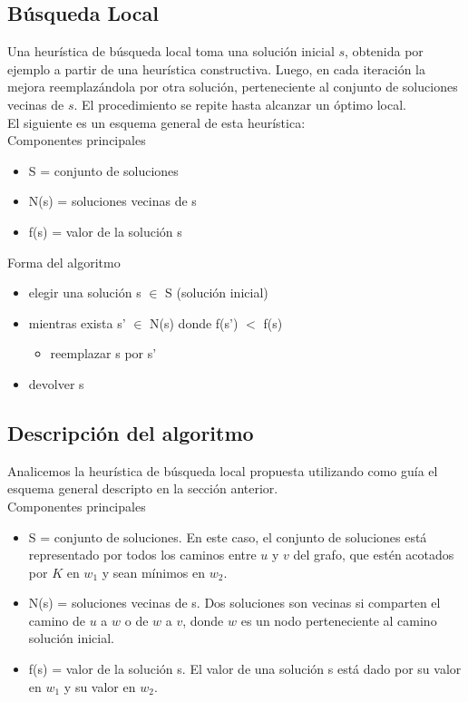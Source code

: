 \subsection{B\'usqueda Local}

Una heur\'istica de b\'usqueda local toma una soluci\'on inicial $s$, obtenida por ejemplo a partir de una heur\'istica constructiva. Luego, en cada iteraci\'on la mejora reemplaz\'andola por otra soluci\'on, perteneciente al conjunto de soluciones vecinas de $s$. El procedimiento se repite hasta alcanzar un \'optimo local.\\
El siguiente es un esquema general de esta heur\'istica:\\
Componentes principales

\begin{itemize}
\item S = conjunto de soluciones
\item N(s) = soluciones vecinas de s
\item f(s) = valor de la soluci\'on s
\end{itemize}

Forma del algoritmo
\begin{itemize}
\item elegir una soluci\'on s $\in$ S (soluci\'on inicial)
\item mientras exista s' $\in$ N(s) donde f(s') $<$ f(s)
\begin{itemize}
	\item reemplazar s por s'
\end{itemize}
\item devolver s
\end{itemize}

\subsection{Descripci\'on del algoritmo}

Analicemos la heur\'istica de b\'usqueda local propuesta utilizando como gu\'ia el esquema general descripto en la secci\'on anterior.\\

Componentes principales
\begin{itemize}
\item S = conjunto de soluciones. En este caso, el conjunto de soluciones est\'a representado por todos los caminos entre $u$ y $v$ del grafo, que est\'en acotados por $K$ en $w_1$ y sean m\'inimos en $w_2$.
\item N(s) = soluciones vecinas de s. Dos soluciones son vecinas si comparten el camino de $u$ a $w$ o de $w$ a $v$, donde $w$ es un nodo perteneciente al camino soluci\'on inicial. 
\item f(s) = valor de la soluci\'on s. El valor de una soluci\'on s est\'a dado por su valor en $w_1$ y su valor en $w_2$.
\end{itemize}

